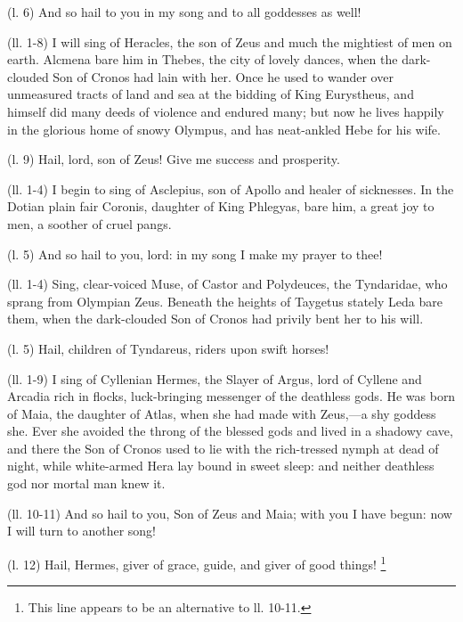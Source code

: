 (l. 6) And so hail to you in my song and to all goddesses as well!


(ll. 1-8) I will sing of Heracles, the son of Zeus and much the mightiest of
men on earth. Alcmena bare him in Thebes, the city of lovely dances, when the
dark-clouded Son of Cronos had lain with her. Once he used to wander over
unmeasured tracts of land and sea at the bidding of King Eurystheus, and
himself did many deeds of violence and endured many; but now he lives happily
in the glorious home of snowy Olympus, and has neat-ankled Hebe for his wife.

(l. 9) Hail, lord, son of Zeus! Give me success and prosperity.


(ll. 1-4) I begin to sing of Asclepius, son of Apollo and healer of sicknesses.
In the Dotian plain fair Coronis, daughter of King Phlegyas, bare him, a great
joy to men, a soother of cruel pangs.

(l. 5) And so hail to you, lord: in my song I make my prayer to thee!


(ll. 1-4) Sing, clear-voiced Muse, of Castor and Polydeuces, the Tyndaridae,
who sprang from Olympian Zeus. Beneath the heights of Taygetus stately Leda
bare them, when the dark-clouded Son of Cronos had privily bent her to his
will.

(l. 5) Hail, children of Tyndareus, riders upon swift horses!


(ll. 1-9) I sing of Cyllenian Hermes, the Slayer of Argus, lord of Cyllene and
Arcadia rich in flocks, luck-bringing messenger of the deathless gods. He was
born of Maia, the daughter of Atlas, when she had made with Zeus,—a shy
goddess she. Ever she avoided the throng of the blessed gods and lived in a
shadowy cave, and there the Son of Cronos used to lie with the rich-tressed
nymph at dead of night, while white-armed Hera lay bound in sweet sleep: and
neither deathless god nor mortal man knew it.

(ll. 10-11) And so hail to you, Son of Zeus and Maia; with you I have begun:
now I will turn to another song!

(l. 12) Hail, Hermes, giver of grace, guide, and giver of good things! \footnote{This line appears to be an
alternative to ll. 10-11.}

